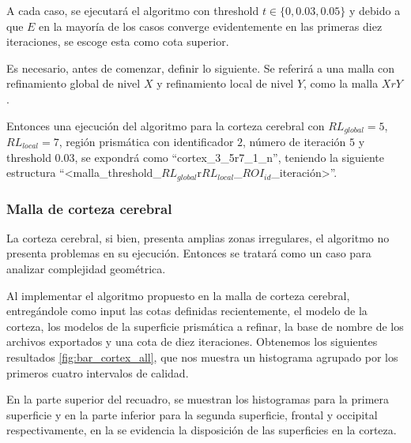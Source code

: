 A cada caso, se ejecutará el algoritmo con threshold $t \in \{ 0, 0.03, 0.05 \}$ y debido a que $E$ en la mayoría de los casos converge evidentemente en las primeras diez iteraciones, se escoge esta como cota superior.

Es necesario, antes de comenzar, definir lo siguiente. Se referirá a una malla con refinamiento global de nivel $X$ y refinamiento local de nivel $Y$, como la malla $XrY$.

Entonces una ejecución del algoritmo para la corteza cerebral con $RL_{global}=5$, $RL_{local}=7$, región prismática con identificador $2$, número de iteración $5$ y threshold $0.03$,  se expondrá como ``cortex\_3\_5r7\_1\_n'', teniendo la siguiente estructura ``<malla\_threshold\_$RL_{global}$r$RL_{local}$\_$ROI_{id}$\_iteración>''.

\subsubsection{Malla de corteza cerebral}

La corteza cerebral, si bien, presenta amplias zonas irregulares, el algoritmo no presenta problemas en su ejecución. Entonces se tratará como un caso para analizar complejidad geométrica.

Al implementar el algoritmo propuesto en la malla de corteza cerebral, entregándole como input las cotas definidas recientemente, el modelo de la corteza, los modelos de la superficie prismática a refinar, la base de nombre de los archivos exportados y una cota de diez iteraciones.  Obtenemos los siguientes resultados \autoref{fig:bar_cortex_all}, que nos muestra un histograma agrupado por los primeros cuatro intervalos de calidad.

En la parte superior del recuadro, se muestran los histogramas para la primera superficie y en la parte inferior para la segunda superficie, frontal y occipital respectivamente, en la  se evidencia la disposición de las superficies en la corteza.


